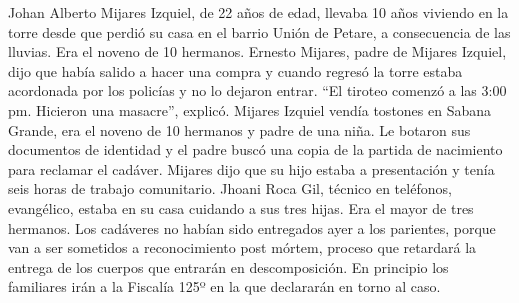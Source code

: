 \documentclass{article}%
\begin{document}
\newline%
%
Johan Alberto Mijares Izquiel, de 22 años de edad, llevaba 10 años viviendo en la torre desde que perdió su casa en el barrio Unión de Petare, a consecuencia de las lluvias. Era el noveno de 10 hermanos.%
\newline%
%
Ernesto Mijares, padre de Mijares Izquiel, dijo que había salido a hacer una compra y cuando regresó la torre estaba acordonada por los policías y no lo dejaron entrar. “El tiroteo comenzó a las 3:00 pm. Hicieron una masacre”, explicó.%
\newline%
%
Mijares Izquiel vendía tostones en Sabana Grande, era el noveno de 10 hermanos y padre de una niña. Le botaron sus documentos de identidad y el padre buscó una copia de la partida de nacimiento para reclamar el cadáver. Mijares dijo que su hijo estaba a presentación y tenía seis horas de trabajo comunitario.%
\newline%
%
Jhoani Roca Gil, técnico en teléfonos, evangélico, estaba en su casa cuidando a sus tres hijas. Era el mayor de tres hermanos.%
\newline%
%
Los cadáveres no habían sido entregados ayer a los parientes, porque van a ser sometidos a reconocimiento post mórtem, proceso que retardará la entrega de los cuerpos que entrarán en descomposición. En principio los familiares irán a la Fiscalía 125º en la que declararán en torno al caso.%
\newline%
%
\end{document}
